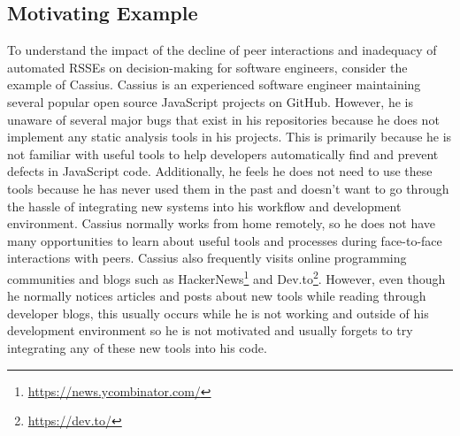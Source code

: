 \subsection{Motivating Example}

To understand the impact of the decline of peer interactions and inadequacy of automated RSSEs on decision-making for software engineers, consider the example of Cassius. Cassius is an experienced software engineer maintaining several popular open source JavaScript projects on GitHub. However, he is unaware of several major bugs that exist in his repositories because he does not implement any static analysis tools in his projects. This is primarily because he is not familiar with useful tools to help developers automatically find and prevent defects in JavaScript code. Additionally, he feels he does not need to use these tools because he has never used them in the past and doesn't want to go through the hassle of integrating new systems into his workflow and development environment. Cassius normally works from home remotely, so he does not have many opportunities to learn about useful tools and processes during face-to-face interactions with peers. Cassius also frequently visits online programming communities and blogs such as HackerNews\footnote{\url{https://news.ycombinator.com/}} and Dev.to\footnote{\url{https://dev.to/}}. However, even though he normally notices articles and posts about new tools while reading through developer blogs, this usually occurs while he is not working and outside of his development environment so he is not motivated and usually forgets to try integrating any of these new tools into his code.

